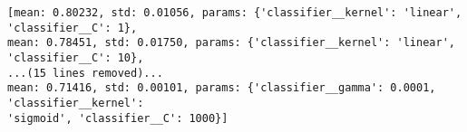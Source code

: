 \begin{lstlisting}[caption={Output from SVC tutorial (testing with linear, rbf and sigmoid)}, label={lst:svc_tutorial}] 
[mean: 0.80232, std: 0.01056, params: {'classifier__kernel': 'linear', 'classifier__C': 1}, 
mean: 0.78451, std: 0.01750, params: {'classifier__kernel': 'linear', 'classifier__C': 10}, 
...(15 lines removed)...
mean: 0.71416, std: 0.00101, params: {'classifier__gamma': 0.0001, 'classifier__kernel': 
'sigmoid', 'classifier__C': 1000}]
\end{lstlisting}

\begin{comment}
Should this be used, is this relevant? Seems a bit like whining over everything that failed, etc.

Another issue was that since few tutorials had the data sets available, it was hard to compare my results against theirs to (considering version changes).
In Scikit-learns tutorial for text data \cite{Scikitlearn.org2016h}, they have at the end task suggestions, with attached solutions in the Scikit-learn library.
When looking at the solution for the second task (sentiment analysis), I saw that they used \gls{sgd} (see \cite{Scikitlearn.org2016f}).
Looking at the suggested "road map" (see Appendix \ref{app:ml_map}, Figure \ref{fig:ml_map} on p.~\pageref{app:ml_map}), 
I accidentally misread a zero and decided to go with \gls{sgd} instead of \gls{svc}.
\vspace{0.5em}\newline
When understanding more about how GridSearchCV worked and how one could select the best parameters from it, things got back on track. 
However, when comparing it against the \gls{svc}, it turned out that the \gls{svc} got a higher score\footnote{
A comparison was done on \gls{sgd}, \gls{svc} and LinearSVC using GridSearchCV.
}. 
\end{comment}


